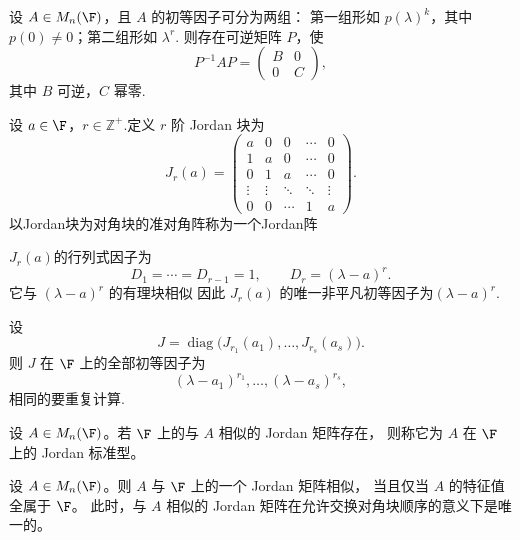 \begin{example}
	设 $A\in M_n(\F)$，且 $A$ 的初等因子可分为两组：
	第一组形如 $p(\lambda)^k$，其中 $p(0)\neq0$；第二组形如 $\lambda^r$.
	则存在可逆矩阵 $P$，使
	\[
	P^{-1}AP=
	\begin{pmatrix}
		B&0\\
		0&C
	\end{pmatrix},
	\]
	其中 $B$ 可逆，$C$ 幂零.
\end{example}


\begin{definition}\label{p1:concept:c5-l2911}
	设 $a\in\F$，$r\in\mathbb{Z}^+$.定义 $r$ 阶 Jordan 块为
	\[
	J_r(a)=
	\begin{pmatrix}
		a&0&0&\cdots&0\\
		1&a&0&\cdots&0\\
		0&1&a&\cdots&0\\
		\vdots&\vdots&\ddots&\ddots&\vdots\\
		0&0&\cdots&1&a
	\end{pmatrix}.
	\]
	以Jordan块为对角块的准对角阵称为一个Jordan阵
\end{definition}
$J_r(a)$的行列式因子为
\[
D_1=\cdots=D_{r-1}=1,\qquad
D_r=(\lambda-a)^r.
\]
它与 $(\lambda-a)^r$ 的有理块相似
因此 $J_r(a)$ 的唯一非平凡初等因子为$(\lambda-a)^r.$


\begin{lemma}
	设
	\[
	J=\operatorname{diag}
	\bigl(
	J_{r_1}(a_1),\ldots,J_{r_s}(a_s)
	\bigr).
	\]
	则 $J$ 在 $\F$ 上的全部初等因子为
	\[
	(\lambda-a_1)^{r_1},\ldots,(\lambda-a_s)^{r_s},
	\]
	相同的要重复计算.
\end{lemma}


\begin{definition}\label{p1:concept:c5-l2950}
	设 $A\in M_n(\F)$。若 $\F$ 上的与 $A$ 相似的 Jordan 矩阵存在，
	则称它为 $A$ 在 $\F$ 上的 Jordan 标准型。
\end{definition}

\begin{theorem}
	设 $A\in M_n(\F)$。则 $A$ 与 $\F$ 上的一个 Jordan 矩阵相似，
	当且仅当 $A$ 的特征值全属于 $\F$。
	此时，与 $A$ 相似的 Jordan 矩阵在允许交换对角块顺序的意义下是唯一的。
\end{theorem}

